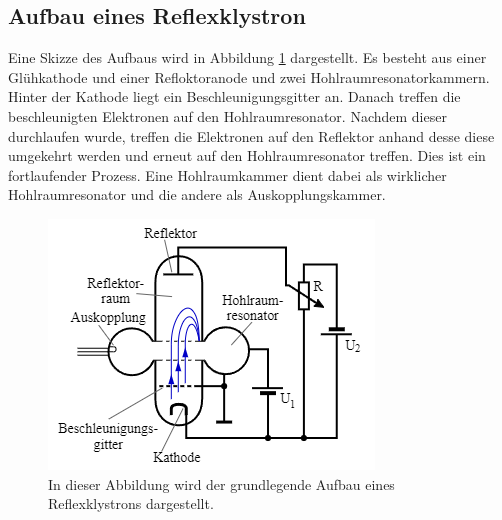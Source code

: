 \subsection{Aufbau eines Reflexklystron}
\label{subsec:aufbau_klystron}
Eine Skizze des Aufbaus wird in Abbildung \ref{fig:reflexklystron} dargestellt. Es besteht aus einer Glühkathode und einer Refloktoranode und zwei Hohlraumresonatorkammern. Hinter 
der Kathode liegt ein Beschleunigungsgitter an. Danach treffen die beschleunigten Elektronen auf den Hohlraumresonator. Nachdem dieser durchlaufen wurde, treffen die Elektronen auf 
den Reflektor anhand desse diese umgekehrt werden und erneut auf den Hohlraumresonator treffen. Dies ist ein fortlaufender Prozess. Eine Hohlraumkammer dient dabei als wirklicher 
Hohlraumresonator und die andere als Auskopplungskammer.
\begin{figure}
              \centering
              \includegraphics{content/reflexklystron.PNG}
              \caption{In dieser Abbildung wird der grundlegende Aufbau eines Reflexklystrons dargestellt.}
              \label{fig:reflexklystron}
\end{figure}
